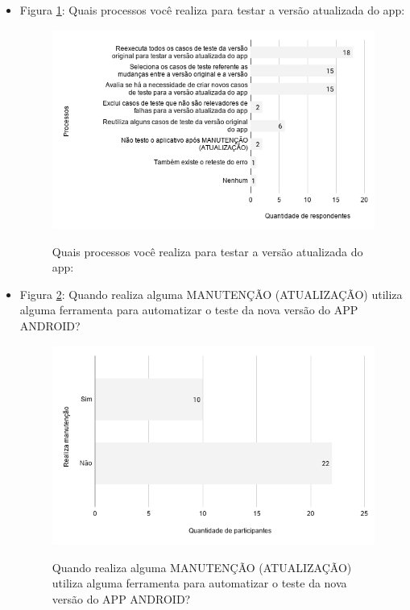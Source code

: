 \begin{itemize}
    
    \item Figura \ref{figure:s_processostestemanutencao}: Quais processos você realiza para testar a versão atualizada do app:
    \begin{figure}[!htb]
    \centering
    \includegraphics[width=.80\textwidth]{images/s_processostestemanutencao.png}
    \label{figure:s_processostestemanutencao}
    \caption{Quais processos você realiza para testar a versão atualizada do app:}
    \end{figure} 
    
    
    \item Figura \ref{figure:s_testenovo}: Quando realiza alguma MANUTENÇÃO (ATUALIZAÇÃO) utiliza alguma ferramenta para automatizar o teste da nova versão do APP ANDROID?
    \begin{figure}[!htb]
    \centering
    \includegraphics[width=.80\textwidth]{images/s_testenovo.png}
    \label{figure:s_testenovo}
    \caption{Quando realiza alguma MANUTENÇÃO (ATUALIZAÇÃO) utiliza alguma ferramenta para automatizar o teste da nova versão do APP ANDROID?}
    \end{figure}
    

\end{itemize}
